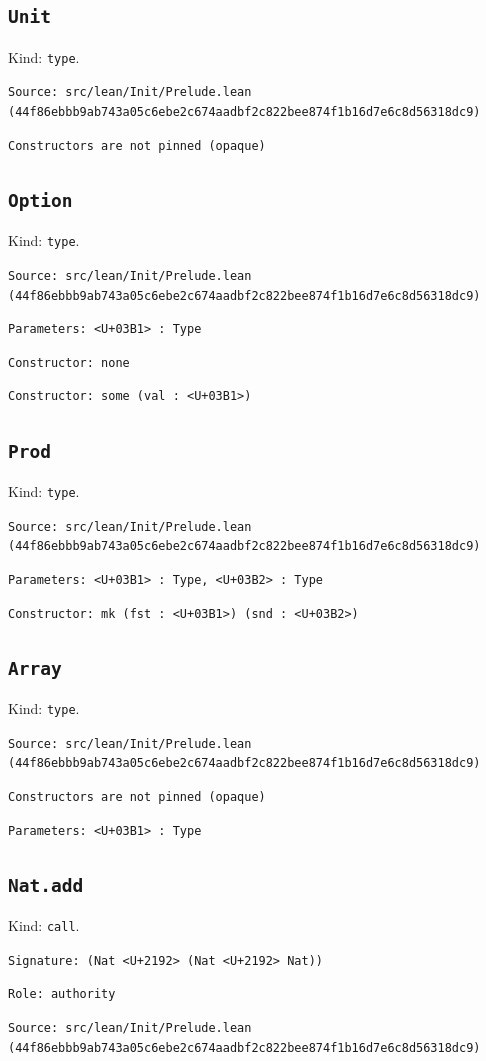 \documentclass[11pt]{article}
\begin{document}
\subsection*{\texttt{Unit}}
\noindent Kind: \texttt{type}.\par
\noindent \texttt{Source: src/lean/Init/Prelude.lean (44f86ebbb9ab743a05c6ebe2c674aadbf2c822bee874f1b16d7e6c8d56318dc9)}\par
\noindent \texttt{Constructors are not pinned (opaque)}\par
\subsection*{\texttt{Option}}
\noindent Kind: \texttt{type}.\par
\noindent \texttt{Source: src/lean/Init/Prelude.lean (44f86ebbb9ab743a05c6ebe2c674aadbf2c822bee874f1b16d7e6c8d56318dc9)}\par
\noindent \texttt{Parameters: <U+03B1> : Type}\par
\noindent \texttt{Constructor: none }\par
\noindent \texttt{Constructor: some (val : <U+03B1>)}\par
\subsection*{\texttt{Prod}}
\noindent Kind: \texttt{type}.\par
\noindent \texttt{Source: src/lean/Init/Prelude.lean (44f86ebbb9ab743a05c6ebe2c674aadbf2c822bee874f1b16d7e6c8d56318dc9)}\par
\noindent \texttt{Parameters: <U+03B1> : Type, <U+03B2> : Type}\par
\noindent \texttt{Constructor: mk (fst : <U+03B1>) (snd : <U+03B2>)}\par
\subsection*{\texttt{Array}}
\noindent Kind: \texttt{type}.\par
\noindent \texttt{Source: src/lean/Init/Prelude.lean (44f86ebbb9ab743a05c6ebe2c674aadbf2c822bee874f1b16d7e6c8d56318dc9)}\par
\noindent \texttt{Constructors are not pinned (opaque)}\par
\noindent \texttt{Parameters: <U+03B1> : Type}\par
\subsection*{\texttt{Nat.add}}
\noindent Kind: \texttt{call}.\par
\noindent \texttt{Signature: (Nat <U+2192> (Nat <U+2192> Nat))}\par
\noindent \texttt{Role: authority}\par
\noindent \texttt{Source: src/lean/Init/Prelude.lean (44f86ebbb9ab743a05c6ebe2c674aadbf2c822bee874f1b16d7e6c8d56318dc9)}\par
\end{document}
